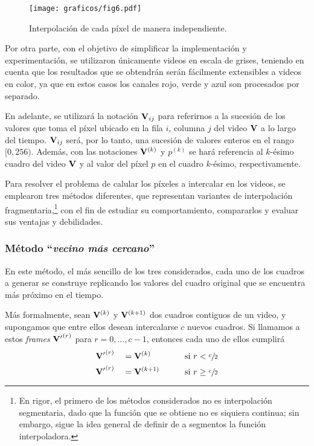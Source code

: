     \begin{figure}[h]
      \centering

      \texttt{[image: graficos/fig6.pdf]} \vspace{1em} \\

      \caption{Interpolación de cada píxel de manera independiente.}
      \label{fig:pixeles-indep}
    \end{figure}

    Por otra parte, con el objetivo de simplificar la implementación y experimentación, se utilizaron únicamente videos en escala de grises, teniendo en cuenta que los resultados que se obtendrán serán fácilmente extensibles a videos en color, ya que en estos casos los canales rojo, verde y azul son procesados por separado.

    En adelante, se utilizará la notación $\mathbf{V}_{ij}$ para referirnos a la sucesión de los valores que toma el píxel ubicado en la fila $i$, columna $j$ del video $\mathbf{V}$ a lo largo del tiempo. $\mathbf{V}_{ij}$ será, por lo tanto, una sucesión de valores enteros en el rango $[0, 256)$. Además, con las notaciones $\mathbf{V}^{(k)}$ y $p^{(k)}$ se hará referencia al $k$-ésimo cuadro del video $\mathbf{V}$ y al valor del píxel $p$ en el cuadro $k$-ésimo, respectivamente.

    Para resolver el problema de calular los píxeles a intercalar en los videos, se emplearon tres métodos diferentes, que representan variantes de interpolación fragmentaria,\footnote{En rigor, el primero de los métodos considerados no es interpolación segmentaria, dado que la función que se obtiene no es siquiera continua; sin embargo, sigue la idea general de definir de a segmentos la función interpoladora.} con el fin de estudiar su comportamiento, compararlos y evaluar sus ventajas y debilidades.

      \subsubsection{Método ``\emph{vecino más cercano}''}
        En este método, el más sencillo de los tres considerados, cada uno de los cuadros a generar se construye replicando los valores del cuadro original que se encuentra más próximo en el tiempo.

        Más formalmente, sean $\mathbf{V}^{(k)}$ y $\mathbf{V}^{(k+1)}$ dos cuadros contiguos de un video, y supongamos que entre ellos desean intercalarse $c$ nuevos cuadros. Si llamamos a estos \emph{frames} $\mathbf{V'}^{(r)}$ para $r = 0, \dots, c - 1$, entonces cada uno de ellos cumplirá
        \begin{alignat*}{3}
          &\mathbf{V'}^{(r)} &&= \mathbf{V}^{(k)} && \qquad \text{si } r < \sfrac{c}{2} \\
          &\mathbf{V'}^{(r)} &&= \mathbf{V}^{(k+1)} && \qquad \text{si } r \geq \sfrac{c}{2}
        \end{alignat*}

